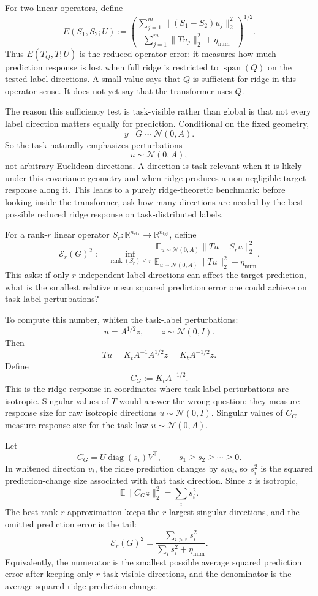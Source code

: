 \documentclass[11pt]{article}
\newcommand{\R}{\mathbb{R}}
\newcommand{\spanop}{\operatorname{span}}
\begin{document}
For two linear operators, define
\[
E(S_1,S_2;U)
:=
\left(
\frac{
\sum_{j=1}^m\|(S_1-S_2)u_j\|_2^2
}{
\sum_{j=1}^m\|Tu_j\|_2^2+\eta_{\mathrm{num}}
}
\right)^{1/2}.
\]
Thus \(E(T_Q,T;U)\) is the reduced-operator error: it measures how much prediction response is lost
when full ridge is restricted to \(\spanop(Q)\) on the tested label directions. A small value says
that \(Q\) is sufficient for ridge in this operator sense. It does not yet say that the transformer
uses \(Q\).

The reason this sufficiency test is task-visible rather than global is that not every label direction
matters equally for prediction. Conditional on the fixed geometry,
\[
y\mid G\sim\mathcal{N}(0,A).
\]
So the task naturally emphasizes perturbations
\[
u\sim\mathcal{N}(0,A),
\]
not arbitrary Euclidean directions. A direction is task-relevant when it is likely under this
covariance geometry and when ridge produces a non-negligible target response along it. This leads
to a purely ridge-theoretic benchmark: before looking inside the transformer, ask how many
directions are needed by the best possible reduced ridge response on task-distributed labels.

For a rank-\(r\) linear operator \(S_r:\R^{n_{\mathrm{ctx}}}\to\R^{n_{\mathrm{tgt}}}\), define
\[
\mathcal{E}_r(G)^2
:=
\inf_{\operatorname{rank}(S_r)\le r}
\frac{
\mathbb{E}_{u\sim\mathcal{N}(0,A)}\|Tu-S_ru\|_2^2
}{
\mathbb{E}_{u\sim\mathcal{N}(0,A)}\|Tu\|_2^2+\eta_{\mathrm{num}}
}.
\]
This asks: if only \(r\) independent label directions can affect the target prediction, what is the
smallest relative mean squared prediction error one could achieve on task-label perturbations?

To compute this number, whiten the task-label perturbations:
\[
u=A^{1/2}z,\qquad z\sim\mathcal{N}(0,I).
\]
Then
\[
Tu=K_tA^{-1}A^{1/2}z=K_tA^{-1/2}z.
\]
Define
\[
C_G:=K_tA^{-1/2}.
\]
This is the ridge response in coordinates where task-label perturbations are isotropic. Singular
values of \(T\) would answer the wrong question: they measure response size for raw isotropic
directions \(u\sim\mathcal{N}(0,I)\). Singular values of \(C_G\) measure response size for the task
law \(u\sim\mathcal{N}(0,A)\).

Let
\[
C_G=U\operatorname{diag}(s_i)V^\top,
\qquad
s_1\ge s_2\ge\cdots\ge0.
\]
In whitened direction \(v_i\), the ridge prediction changes by \(s_i u_i\), so \(s_i^2\) is the
squared prediction-change size associated with that task direction. Since \(z\) is isotropic,
\[
\mathbb{E}\|C_Gz\|_2^2=\sum_i s_i^2.
\]
The best rank-\(r\) approximation keeps the \(r\) largest singular directions, and the omitted
prediction error is the tail:
\[
\mathcal{E}_r(G)^2
=
\frac{\sum_{i>r}s_i^2}{\sum_i s_i^2+\eta_{\mathrm{num}}}.
\]
Equivalently, the numerator is the smallest possible average squared prediction error after keeping
only \(r\) task-visible directions, and the denominator is the average squared ridge prediction
change.
\end{document}
